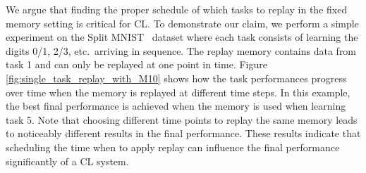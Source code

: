 \begin{figure*}[t]
\centering
\setlength{\figwidth}{.22\textwidth}
\setlength{\figheight}{.13\textheight}

\vspace{-4mm}
\caption{Task accuracies on Split MNIST~\citep{zenke2017continual} when replaying only 10 samples of classes $0/1$ at a single time step. The black vertical line indicates when replay is used. ACC denotes the average accuracy over all tasks after learning Task 5. Results are averaged over 5 seeds. These results show that the time to replay the previous task is critical for the final performance.
}%
\label{fig:single_task_replay_with_M10}
\vspace{-1em}
\end{figure*}

We 
argue that finding the proper schedule of which tasks to replay in the fixed memory setting is critical for CL. To demonstrate our claim, we perform a simple experiment on the Split MNIST~\citep{zenke2017continual} dataset where each task consists of learning the digits 0/1, 2/3, etc.\ arriving in sequence.
The replay memory contains data from task 1 and can only be replayed at one point in time.
Figure \ref{fig:single_task_replay_with_M10} shows how the task performances progress over time when the memory is replayed at different time steps. In this example, the best final performance is achieved when the memory is used when learning task 5.
Note that choosing different time points to replay the same memory leads to noticeably different results in the final performance. 
These results indicate that scheduling the time when to apply replay can influence the final performance significantly of a CL system.  


